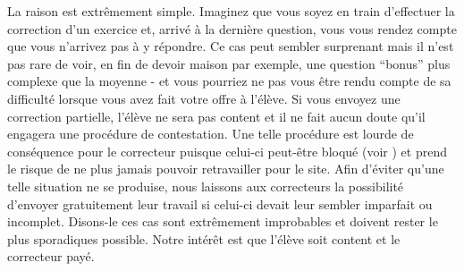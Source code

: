 ﻿La raison est extrêmement simple. Imaginez que vous soyez en train d’effectuer la correction d’un exercice et, arrivé à la dernière question, vous vous rendez compte que vous n’arrivez pas à y répondre. Ce cas peut sembler surprenant mais il n’est pas rare de voir, en fin de devoir maison par exemple, une question “bonus” plus complexe que la moyenne - et vous pourriez ne pas vous être rendu compte de sa difficulté lorsque vous avez fait votre offre à l’élève. Si vous envoyez une correction partielle, l’élève ne sera pas content et il ne fait aucun doute qu’il engagera une procédure de contestation. Une telle procédure est lourde de conséquence pour le correcteur puisque celui-ci peut-être bloqué (voir ) et prend le risque de ne plus jamais pouvoir retravailler pour le site. Afin d’éviter qu’une telle situation ne se produise, nous laissons aux correcteurs la possibilité d’envoyer gratuitement leur travail si celui-ci devait leur sembler imparfait ou incomplet.
Disons-le ces cas sont extrêmement improbables et doivent rester le plus sporadiques possible. Notre intérêt est que l’élève soit content et le correcteur payé.